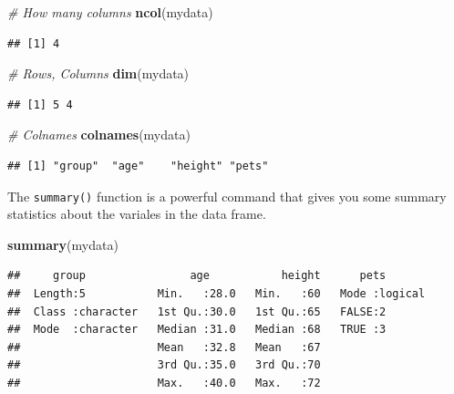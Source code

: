 \documentclass[
]{book}
\newenvironment{Shaded}{\begin{snugshade}}{\end{snugshade}}
\newcommand{\CommentTok}[1]{\textcolor[rgb]{0.56,0.35,0.01}{\textit{#1}}}
\newcommand{\KeywordTok}[1]{\textcolor[rgb]{0.13,0.29,0.53}{\textbf{#1}}}
\newcommand{\NormalTok}[1]{#1}
\begin{document}
\begin{Shaded}
\begin{Highlighting}[]
\CommentTok{# How many columns}
\KeywordTok{ncol}\NormalTok{(mydata)}
\end{Highlighting}
\end{Shaded}

\begin{verbatim}
## [1] 4
\end{verbatim}

\begin{Shaded}
\begin{Highlighting}[]
\CommentTok{# Rows, Columns}
\KeywordTok{dim}\NormalTok{(mydata)}
\end{Highlighting}
\end{Shaded}

\begin{verbatim}
## [1] 5 4
\end{verbatim}

\begin{Shaded}
\begin{Highlighting}[]
\CommentTok{# Colnames}
\KeywordTok{colnames}\NormalTok{(mydata)}
\end{Highlighting}
\end{Shaded}

\begin{verbatim}
## [1] "group"  "age"    "height" "pets"
\end{verbatim}

The \texttt{summary()} function is a powerful command that gives you some summary statistics about the variales in the data frame.

\begin{Shaded}
\begin{Highlighting}[]
\KeywordTok{summary}\NormalTok{(mydata)}
\end{Highlighting}
\end{Shaded}

\begin{verbatim}
##     group                age           height      pets        
##  Length:5           Min.   :28.0   Min.   :60   Mode :logical  
##  Class :character   1st Qu.:30.0   1st Qu.:65   FALSE:2        
##  Mode  :character   Median :31.0   Median :68   TRUE :3        
##                     Mean   :32.8   Mean   :67                  
##                     3rd Qu.:35.0   3rd Qu.:70                  
##                     Max.   :40.0   Max.   :72
\end{verbatim}
\end{document}
